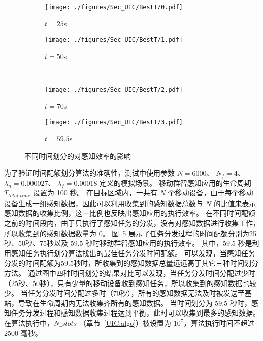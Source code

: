 \begin{figure}[!b]
  \centering
  \begin{subfigure}[h]{0.48\linewidth}
    \centering
    \texttt{[image: ./figures/Sec\_UIC/BestT/0.pdf]}
    \label{Figure_BestTA}
    \vspace{-1.5em}
    \caption{$t=25$s}
  \end{subfigure}
  \begin{subfigure}[h]{0.48\linewidth}
    \centering
    \texttt{[image: ./figures/Sec\_UIC/BestT/1.pdf]}
    \label{Figure_BestTB}
    \vspace{-1.5em}
    \caption{$t=50$s}
  \end{subfigure}\\
  \begin{subfigure}[h]{0.48\linewidth}
    \centering
    \texttt{[image: ./figures/Sec\_UIC/BestT/2.pdf]}
    \label{Figure_BestTC}
    \vspace{-1.5em}
    \caption{$t=70$s}
  \end{subfigure}
  \begin{subfigure}[h]{0.48\linewidth}
    \centering
    \texttt{[image: ./figures/Sec\_UIC/BestT/3.pdf]}
    \label{Figure_BestTD}
    \vspace{-1.5em}
    \caption{$t=59.5$s}
  \end{subfigure}
  \vspace{-0.5em}
  \caption{不同时间划分的对感知效率的影响}
\label{Figure_BestT}
\end{figure}

为了验证时间配额划分算法的准确性，测试中使用参数 $N=6000$、 $N_f=4$、 $\lambda_n = 0.000027$、 $\lambda_f=0.00018$ 定义的模拟场景。
移动群智感知应用的生命周期 $T_{total\_time}$ 设置为 100 秒。
在目标区域内，一共有 $N$ 个移动设备，由于每个移动设备生成一组感知数据，因此可以利用收集到的感知数据总数与 $N$ 的比值来表示感知数据的收集比例，这一比例也反映出感知应用的执行效率。
在不同时间配额之前的时间段内，由于只执行了感知任务的分发，没有对感知数据进行收集工作，所以收集到的感知数据数量为 $0$。
图~\ref{Figure_BestT} 展示了任务分发过程的时间配额分别为25秒、50秒、75秒以及 59.5 秒时移动群智感知应用的执行效率。
其中，59.5 秒是利用感知任务执行划分算法找出的最佳任务分发时间配额。
可以发现，当感知任务分发的时间配额为59.5秒时，所收集到的感知数据总量远远高于其它三种时间划分方法。
通过图中四种时间划分的结果对比可以发现，当任务分发时间分配过少时（25秒、50秒），只有少量的移动设备收到感知任务，所以收集到的感知数据也较少。
当任务分发时间分配过多时（70秒），所有的感知数据无法及时被发送至基站，导致在生命周期内无法收集齐所有的感知数据。
当时间划分为 59.5 秒时，感知任务分发过程和感知数据收集过程达到平衡，此时可以收集到最多的感知数据。
在算法执行中，$N\_slots$ （章节~\ref{UIC:algo}）被设置为 $10^7$，算法执行时间不超过 2500 毫秒。

